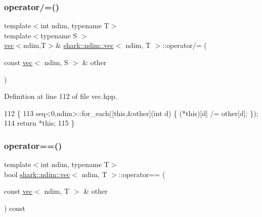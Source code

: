 \hypertarget{structshark_1_1ndim_1_1vec_a9b9aa95a9329ad2877f57c62774063e1}{}\label{structshark_1_1ndim_1_1vec_a9b9aa95a9329ad2877f57c62774063e1} 
\subsubsection{\texorpdfstring{operator/=()}{operator/=()}\hspace{0.1cm}{\footnotesize\ttfamily [2/2]}}
{\footnotesize\ttfamily template$<$int ndim, typename T$>$ \\
template$<$typename S $>$ \\
\hyperlink{structshark_1_1ndim_1_1vec}{vec}$<$ndim,T$>$\& \hyperlink{structshark_1_1ndim_1_1vec}{shark\+::ndim\+::vec}$<$ ndim, T $>$\+::operator/= (\begin{DoxyParamCaption}\item[{const \hyperlink{structshark_1_1ndim_1_1vec}{vec}$<$ ndim, S $>$ \&}]{other }\end{DoxyParamCaption})\hspace{0.3cm}{\ttfamily [inline]}}



Definition at line 112 of file vec.\+hpp.


\begin{DoxyCode}
112                                                                             \{
113             seq<0,ndim>::for\_each([\textcolor{keyword}{this},&other](\textcolor{keywordtype}{int} d) \{ (*this)[d] /= other[d]; \});
114             \textcolor{keywordflow}{return} *\textcolor{keyword}{this};
115         \}
\end{DoxyCode}
\hypertarget{structshark_1_1ndim_1_1vec_a796dd27a2b072a4b5e0618bb5851bfa8}{}\label{structshark_1_1ndim_1_1vec_a796dd27a2b072a4b5e0618bb5851bfa8} 
\subsubsection{\texorpdfstring{operator==()}{operator==()}}
{\footnotesize\ttfamily template$<$int ndim, typename T$>$ \\
bool \hyperlink{structshark_1_1ndim_1_1vec}{shark\+::ndim\+::vec}$<$ ndim, T $>$\+::operator== (\begin{DoxyParamCaption}\item[{const \hyperlink{structshark_1_1ndim_1_1vec}{vec}$<$ ndim, T $>$ \&}]{other }\end{DoxyParamCaption}) const\hspace{0.3cm}{\ttfamily [inline]}}



